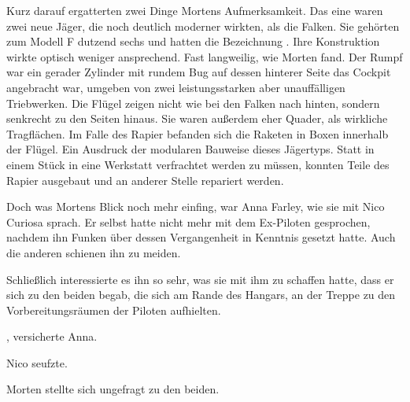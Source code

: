 \par

Kurz darauf ergatterten zwei Dinge Mortens Aufmerksamkeit. Das eine waren zwei neue Jäger, die noch deutlich moderner wirkten, als die Falken. Sie gehörten zum Modell F dutzend sechs und hatten die Bezeichnung . Ihre Konstruktion wirkte optisch weniger ansprechend. Fast langweilig, wie Morten fand. Der Rumpf war ein gerader Zylinder mit rundem Bug auf dessen hinterer Seite das Cockpit angebracht war, umgeben von zwei leistungsstarken aber unauffälligen Triebwerken. Die Flügel zeigen nicht wie bei den Falken nach hinten, sondern senkrecht zu den Seiten hinaus. Sie waren außerdem eher Quader, als wirkliche Tragflächen. Im Falle des Rapier befanden sich die Raketen in Boxen innerhalb der Flügel. Ein Ausdruck der modularen Bauweise dieses Jägertyps. Statt in einem Stück in eine Werkstatt verfrachtet werden zu müssen, konnten Teile des Rapier ausgebaut und an anderer Stelle repariert werden.

\par

Doch was Mortens Blick noch mehr einfing, war Anna Farley, wie sie mit Nico Curiosa sprach. Er selbst hatte nicht mehr mit dem Ex-Piloten gesprochen, nachdem ihn Funken über dessen Vergangenheit in Kenntnis gesetzt hatte. Auch die anderen schienen ihn zu meiden.

\par

Schließlich interessierte es ihn so sehr, was sie mit ihm zu schaffen hatte, dass er sich zu den beiden begab, die sich am Rande des Hangars, an der Treppe zu den Vorbereitungsräumen der Piloten aufhielten.

\par

, versicherte Anna. 

\par

Nico seufzte. 

\par

Morten stellte sich ungefragt zu den beiden. 

